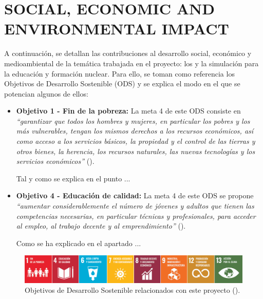 \newpage
\section{SOCIAL, ECONOMIC AND ENVIRONMENTAL IMPACT} \label{impact}

A continuación, se detallan las contribuciones al desarrollo social, económico y medioambiental de la temática trabajada en el proyecto: los  y la simulación para la educación y formación nuclear. Para ello, se toman como referencia los Objetivos de Desarrollo Sostenible (ODS) y se explica el modo en el que se potencian algunos de ellos:

\begin{itemize}
    \item \textbf{Objetivo 1 - Fin de la pobreza:} La meta 4 de este ODS consiste en \textit{``garantizar que todos los hombres y mujeres, en particular los pobres y los más vulnerables, tengan los mismos derechos a los recursos económicos, así como acceso a los servicios básicos, la propiedad y el control de las tierras y otros bienes, la herencia, los recursos naturales, las nuevas tecnologías y los servicios económicos''} (\cite{ODS}).
    
    Tal y como se explica en el punto ...

    \item \textbf{Objetivo 4 - Educación de calidad:} La meta 4 de este ODS se propone \textit{``aumentar considerablemente el número de jóvenes y adultos que tienen las competencias necesarias, en particular técnicas y profesionales, para acceder al empleo, al trabajo decente y al emprendimiento''} (\cite{ODS}).
    
    Como se ha explicado en el apartado ...
\end{itemize}

\begin{figure}[h!]
    \centering
    \includegraphics[width=\textwidth]{content/figures/ODS_TFG.png}
    \caption{Objetivos de Desarrollo Sostenible relacionados con este proyecto (\cite{ODS}).}
    \label{fig:ods_tfg}
  \end{figure}